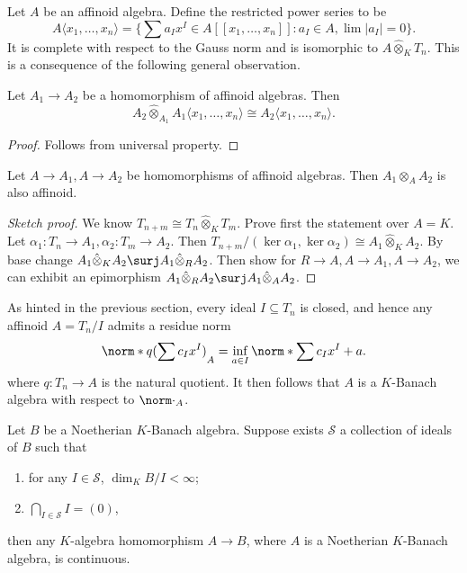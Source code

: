 \documentclass[a4paper]{article}
\begin{document}
\begin{eg}
  Let \(A\) be an affinoid algebra. Define the restricted power series to be
  \[
    A \langle x_1, \dots, x_n \rangle = \{ \sum a_I x^I \in A[[x_1, \dots, x_n]]: a_I \in A, \lim |a_I| = 0 \}.
  \]
  It is complete with respect to the Gauss norm and is isomorphic to \(A \hat \otimes_K T_n\). This is a consequence of the following general observation.
\end{eg}

\begin{proposition}
  Let \(A_1 \to A_2\) be a homomorphism of affinoid algebras. Then
  \[
    A_2 \hat \otimes_{A_1} A_1\langle x_1, \dots, x_n \rangle \cong A_2\langle x_1, \dots, x_n \rangle.
  \]
\end{proposition}

\begin{proof}
  Follows from universal property.
\end{proof}

\begin{theorem}
  Let \(A \to A_1, A \to A_2\) be homomorphisms of affinoid algebras. Then \(A_1 \hat \otimes_A A_2\) is also affinoid.
\end{theorem}

\begin{proof}[Sketch proof]
  We know \(T_{n + m} \cong T_n \hat \otimes_K T_m\). Prove first the statement over \(A = K\). Let \(\alpha_1: T_n \to A_1, \alpha_2: T_m \to A_2\). Then \(T_{n + m}/(\ker \alpha_1, \ker \alpha_2) \cong A_1 \hat \otimes_K A_2\). By base change \(A_1 \hat \otimes_K A_2 \surj A_1 \hat \otimes_R A_2\). Then show for \(R \to A, A \to A_1, A \to A_2\), we can exhibit an epimorphism \(A_1 \hat \otimes_R A_2 \surj A_1 \hat \otimes_A A_2\).
\end{proof}

As hinted in the previous section, every ideal \(I \subseteq T_n\) is closed, and hence any affinoid \(A = T_n/I\) admits a residue norm
\[
  \norm*{q(\sum c_Ix^I)}_A = \inf_{a \in I} \norm*{\sum c_I x^I + a}.
\]
where \(q: T_n \to A\) is the natural quotient. It then follows that \(A\) is a \(K\)-Banach algebra with respect to \(\norm \cdot_A\).

\begin{proposition}
  Let \(B\) be a Noetherian \(K\)-Banach algebra. Suppose exists \(\mathcal S\) a collection of ideals of \(B\) such that
  \begin{enumerate}
  \item for any \(I \in \mathcal S\), \(\dim_K B/I < \infty\);
  \item \(\bigcap_{I \in \mathcal S} I = (0)\),
  \end{enumerate}
  then any \(K\)-algebra homomorphism \(A \to B\), where \(A\) is a Noetherian \(K\)-Banach algebra, is continuous.
\end{proposition}
\end{document}
